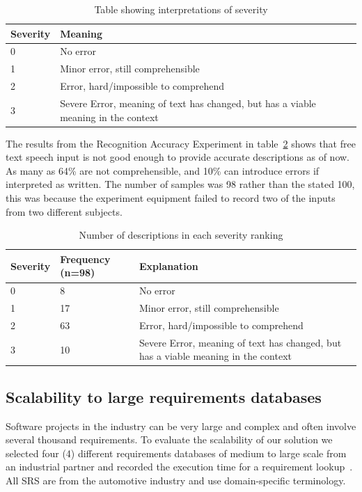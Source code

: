 \documentclass[conference]{IEEEtran}
\begin{document}
\begin{table}[h!]
    \centering
    \caption{Table showing interpretations of severity}
        \begin{tabular}{ l p{7cm} }
            \hline
            Severity & Meaning \\
            \hline
            0 & No error \\
            1 & Minor error, still comprehensible \\
            2 & Error, hard/impossible to comprehend \\
            3 & Severe Error, meaning of text has changed, but has a viable meaning in the context \\
            \end{tabular}
    \label{tab:severity}
\end{table}

The results from the Recognition Accuracy Experiment in table~\ref{tab:recaccexp} shows that free text speech input is not good enough to provide accurate descriptions as of now. As many as 64\% are not comprehensible, and 10\% can introduce errors if interpreted as written. The number of samples was 98 rather than the stated 100, this was because the experiment equipment failed to record two of the inputs from two different subjects.
\begin{table}[h]
\centering
\caption{Number of descriptions in each severity ranking}
    \begin{tabular}{ l  p{2cm}  p{4cm} }
        \hline
        Severity & Frequency (n=98) & Explanation \\
        \hline
        0 & 8 & No error\\
        1 & 17 &  Minor error, still comprehensible\\
        2 & 63 &  Error, hard/impossible to comprehend\\
        3 & 10 & Severe Error, meaning of text has changed, but has a viable meaning in the context\\
        \end{tabular}
\label{tab:recaccexp}
\end{table}

\subsection{Scalability to large requirements databases}

Software projects in the industry can be very large and complex and often involve several thousand requirements.
To evaluate the scalability of our solution we selected four (4) different requirements databases of medium to large scale from an industrial partner and recorded the execution time for a requirement lookup~\cite{regnell2008}.
All SRS are from the automotive industry and use domain-specific terminology.
\end{document}
